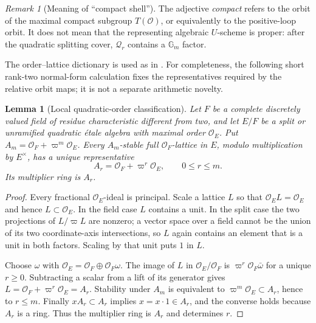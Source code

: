 \documentclass[11pt]{article}
\newtheorem{lemma}[theorem]{Lemma}
\theoremstyle{definition}
\theoremstyle{remark}
\newtheorem{remark}[theorem]{Remark}
\begin{document}
\begin{remark}[Meaning of ``compact shell'']
The adjective \emph{compact} refers to the orbit of the maximal compact
subgroup $T(\mathcal O)$, or equivalently to the positive-loop orbit.  It does
not mean that the representing algebraic $U$-scheme is proper: after the
quadratic splitting cover, $\mathscr Q_r$ contains a $\mathbb G_m$ factor.
\end{remark}

The order--lattice dictionary is used as in
\cite[\S2.1 and \S4.2]{YunOrbitalOrders}.  For completeness, the following
short rank-two normal-form calculation fixes the representatives required
by the relative orbit maps; it is not a separate arithmetic novelty.

\begin{lemma}[Local quadratic-order classification]
\label{lem:PGL2-local-order-classification}
Let $F$ be a complete discretely valued field of residue characteristic
different from two, and let $E/F$ be a split or unramified quadratic
\'etale algebra with maximal order $\mathcal O_E$.  Put
$A_m=\mathcal O_F+\varpi^m\mathcal O_E$.  Every $A_m$-stable full
$\mathcal O_F$-lattice in $E$, modulo multiplication by $E^\times$, has a
unique representative
\[
 A_r=\mathcal O_F+\varpi^r\mathcal O_E,
 \qquad 0\le r\le m.
\]
Its multiplier ring is $A_r$.
\end{lemma}

\begin{proof}
Every fractional $\mathcal O_E$-ideal is principal.  Scale a lattice $L$ so
that $\mathcal O_EL=\mathcal O_E$ and hence $L\subset\mathcal O_E$.  In the
field case $L$ contains a unit.  In the split case the two projections of
$L/\varpi L$ are nonzero; a vector space over a field cannot be the union of
its two coordinate-axis intersections, so $L$ again contains an element that
is a unit in both factors.  Scaling by that unit puts $1$ in $L$.

Choose $\omega$ with
$\mathcal O_E=\mathcal O_F\oplus\mathcal O_F\omega$.  The image of $L$ in
$\mathcal O_E/\mathcal O_F$ is
$\varpi^r\mathcal O_F\bar\omega$ for a unique $r\ge0$.  Subtracting a scalar
from a lift of its generator gives
$L=\mathcal O_F+\varpi^r\mathcal O_E=A_r$.  Stability under $A_m$ is
equivalent to $\varpi^m\mathcal O_E\subset A_r$, hence to $r\le m$.
Finally $xA_r\subset A_r$ implies $x=x\cdot1\in A_r$, and the converse holds
because $A_r$ is a ring.  Thus the multiplier ring is $A_r$ and determines
$r$.
\end{proof}
\end{document}
